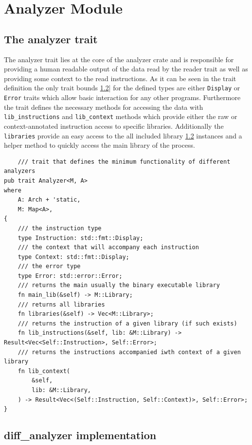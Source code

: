 \section{Analyzer Module}
\label{analyzer}

\subsection{The analyzer trait}
\label{analyzer:trait}

The analyzer trait lies at the core of the analyzer crate and is responsible for providing a human readable output of the data read by the reader trait as well as providing some context to the read instructions. As it can be seen in the trait definition the only trait bounds \ref{}|\cite{} for the defined types are either \verb|Display| or \verb|Error| traits which allow basic interaction for any other programs.
Furthermore the trait defines the necessary methods for accessing the data with \verb|lib_instructions| and \verb|lib_context| methods which provide either the raw or context-annotated instruction access to specific libraries. 
Additionally the \verb|libraries| provide an easy access to the all included library \ref{} instances and a helper method to quickly access the main library of the process.

\begin{lstlisting}
    /// trait that defines the minimum functionality of different analyzers
pub trait Analyzer<M, A>
where
    A: Arch + 'static,
    M: Map<A>,
{
    /// the instruction type
    type Instruction: std::fmt::Display;
    /// the context that will accompany each instruction
    type Context: std::fmt::Display;
    /// the error type
    type Error: std::error::Error;
    /// returns the main usually the binary executable library
    fn main_lib(&self) -> M::Library;
    /// returns all libraries
    fn libraries(&self) -> Vec<M::Library>;
    /// returns the instruction of a given library (if such exists)
    fn lib_instructions(&self, lib: &M::Library) -> Result<Vec<Self::Instruction>, Self::Error>;
    /// returns the instructions accompanied iwth context of a given library
    fn lib_context(
        &self,
        lib: &M::Library,
    ) -> Result<Vec<(Self::Instruction, Self::Context)>, Self::Error>;
}
\end{lstlisting}

\subsection{diff\_analyzer implementation}

